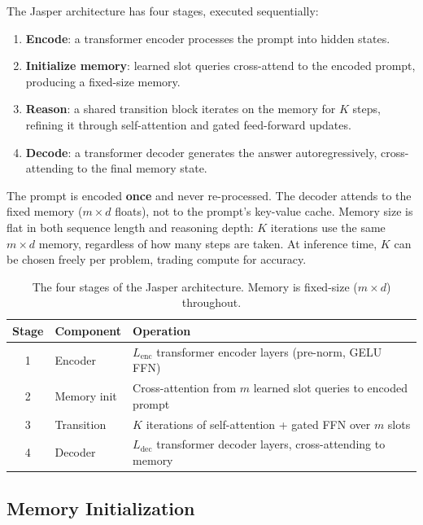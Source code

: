\documentclass[11pt,a4paper]{article}
\begin{document}
The Jasper architecture has four stages, executed sequentially:

\begin{enumerate}[nosep]
    \item \textbf{Encode}: a transformer encoder processes the prompt into hidden states.
    \item \textbf{Initialize memory}: learned slot queries cross-attend to the encoded prompt, producing a fixed-size memory.
    \item \textbf{Reason}: a shared transition block iterates on the memory for $K$ steps, refining it through self-attention and gated feed-forward updates.
    \item \textbf{Decode}: a transformer decoder generates the answer autoregressively, cross-attending to the final memory state.
\end{enumerate}

The prompt is encoded \textbf{once} and never re-processed. The decoder attends to the fixed memory ($m \times d$ floats), not to the prompt's key-value cache. Memory size is flat in both sequence length and reasoning depth: $K$ iterations use the same $m \times d$ memory, regardless of how many steps are taken. At inference time, $K$ can be chosen freely per problem, trading compute for accuracy.

\begin{table}[h]
\centering
\small
\begin{tabularx}{\textwidth}{c l X}
\toprule
\textbf{Stage} & \textbf{Component} & \textbf{Operation} \\
\midrule
1 & Encoder & $L_{\text{enc}}$ transformer encoder layers (pre-norm, GELU FFN) \\
2 & Memory init & Cross-attention from $m$ learned slot queries to encoded prompt \\
3 & Transition & $K$ iterations of self-attention + gated FFN over $m$ slots \\
4 & Decoder & $L_{\text{dec}}$ transformer decoder layers, cross-attending to memory \\
\bottomrule
\end{tabularx}
\caption{The four stages of the Jasper architecture. Memory is fixed-size ($m \times d$) throughout.}
\label{tab:stages}
\end{table}

\subsection{Memory Initialization}
\label{sec:mem-init}
\end{document}
